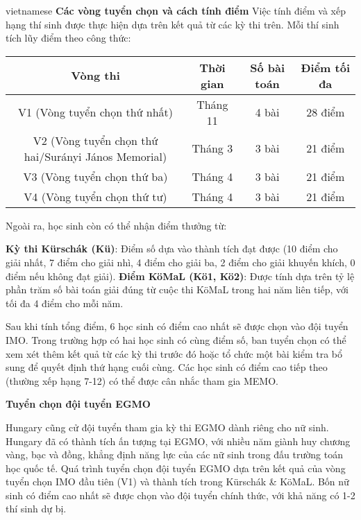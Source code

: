 \documentclass{article}
\begin{document}
\begin{otherlanguage*}{vietnamese}
\textbf{Các vòng tuyển chọn và cách tính điểm}
Việc tính điểm và xếp hạng thí sinh được thực hiện dựa trên kết quả từ các kỳ thi trên. Mỗi thí sinh tích lũy điểm theo công thức:

\begin{center}
    \begin{tabular}{|c|c|c|c|}
        \hline
        \textbf{Vòng thi} & \textbf{Thời gian} & \textbf{Số bài toán} & \textbf{Điểm tối đa} \\
        \hline
        V1 (Vòng tuyển chọn thứ nhất) & Tháng 11 & 4 bài & 28 điểm \\
        \hline
        V2 (Vòng tuyển chọn thứ hai/Surányi János Memorial) & Tháng 3 & 3 bài & 21 điểm \\
        \hline
        V3 (Vòng tuyển chọn thứ ba) & Tháng 4 & 3 bài & 21 điểm \\
        \hline
        V4 (Vòng tuyển chọn thứ tư) & Tháng 4 & 3 bài & 21 điểm \\
        \hline
    \end{tabular}    
\end{center}

Ngoài ra, học sinh còn có thể nhận điểm thưởng từ:
\begin{itemize}[topsep=0pt, partopsep=0pt, itemsep=0pt]
    \ii \textbf{Kỳ thi Kürschák (Kü)}: Điểm số dựa vào thành tích đạt được
    (10 điểm cho giải nhất, 7 điểm cho giải nhì, 4 điểm cho giải ba, 2 điểm cho giải khuyến khích, 0 điểm nếu không đạt giải).
    \ii \textbf{Điểm KöMaL (Kö1, Kö2)}: Được tính dựa trên tỷ lệ phần trăm số bài toán giải đúng từ cuộc thi KöMaL trong hai năm liên tiếp, với tối đa 4 điểm cho mỗi năm.
\end{itemize}

Sau khi tính tổng điểm, 6 học sinh có điểm cao nhất sẽ được chọn vào đội tuyển IMO.
Trong trường hợp có hai học sinh có cùng điểm số, ban tuyển chọn có thể xem xét thêm kết quả từ các kỳ thi trước đó hoặc tổ chức một bài kiểm tra bổ sung để quyết định thứ hạng cuối cùng.
Các học sinh có điểm cao tiếp theo (thường xếp hạng 7-12) có thể được cân nhắc tham gia MEMO.

\textbf{Tuyển chọn đội tuyển EGMO}

Hungary cũng cử đội tuyển tham gia kỳ thi EGMO dành riêng cho nữ sinh.
Hungary đã có thành tích ấn tượng tại EGMO, với nhiều năm giành huy chương vàng, bạc và đồng, khẳng định năng lực của các nữ sinh trong đấu trường toán học quốc tế.
Quá trình tuyển chọn đội tuyển EGMO dựa trên kết quả của vòng tuyển chọn IMO đầu tiên (V1) và thành tích trong Kürschák \& KöMaL.
Bốn nữ sinh có điểm cao nhất sẽ được chọn vào đội tuyển chính thức, với khả năng có 1-2 thí sinh dự bị.


\end{otherlanguage*}
\end{document}
